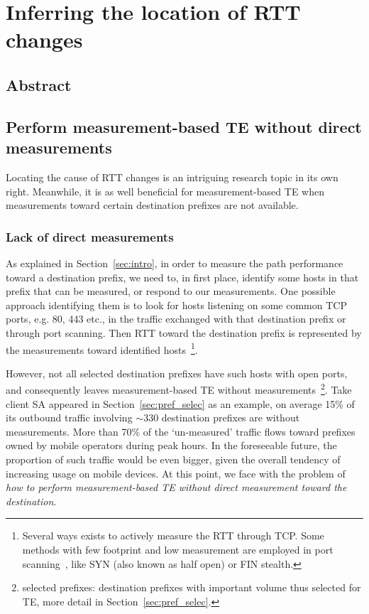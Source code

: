\chapter{Inferring the location of RTT changes}
\label{sec:infer}
\section*{Abstract}

\section{Perform measurement-based TE without direct measurements}
Locating the cause of RTT changes is an intriguing research topic in its own right.
Meanwhile, it is as well beneficial for measurement-based TE when measurements toward certain destination prefixes are not available.

\subsection{Lack of direct measurements}
As explained in Section~\ref{sec:intro}, in order to measure the path performance toward a destination prefix, we need to, in first place, identify some hosts in that prefix that can be measured, or respond to our measurements.
One possible approach identifying them is to look for hosts listening on some common TCP ports, e.g. 80, 443 etc., in the traffic exchanged with that destination prefix or through port scanning.
Then RTT toward the destination prefix is represented by the measurements toward identified hosts~\footnote{Several ways exists to actively measure the RTT through TCP. Some methods with few footprint and low measurement are employed in port scanning~\cite{nmap}, like SYN (also known as half open) or FIN stealth.}.

However, not all selected destination prefixes have such hosts with open ports, and
consequently leaves measurement-based TE without measurements~\footnote{selected prefixes: destination prefixes with important volume thus selected for TE, more detail in Section~\ref{sec:pref_selec}.}.
Take client SA appeared in Section~\ref{sec:pref_selec} as an example, on average 15\% of its outbound traffic involving $\sim 330$ destination prefixes are without measurements.
More than 70\% of the `un-measured' traffic flows toward prefixes owned by mobile operators during peak hours.
In the foreseeable future, the proportion of such traffic would be even bigger, given the overall tendency of increasing usage on mobile devices.
At this point, we face with the problem of \textit{how to perform measurement-based TE without direct measurement toward the destination}. 

